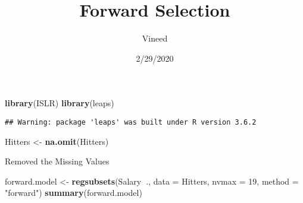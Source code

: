 \documentclass[
]{article}
\title{Forward Selection}
\author{Vineed}
\date{2/29/2020}
\newenvironment{Shaded}{\begin{snugshade}}{\end{snugshade}}
\newcommand{\DataTypeTok}[1]{\textcolor[rgb]{0.13,0.29,0.53}{#1}}
\newcommand{\DecValTok}[1]{\textcolor[rgb]{0.00,0.00,0.81}{#1}}
\newcommand{\KeywordTok}[1]{\textcolor[rgb]{0.13,0.29,0.53}{\textbf{#1}}}
\newcommand{\NormalTok}[1]{#1}
\newcommand{\OperatorTok}[1]{\textcolor[rgb]{0.81,0.36,0.00}{\textbf{#1}}}
\newcommand{\StringTok}[1]{\textcolor[rgb]{0.31,0.60,0.02}{#1}}
\begin{document}
\maketitle

\begin{Shaded}
\begin{Highlighting}[]
\KeywordTok{library}\NormalTok{(ISLR)}
\KeywordTok{library}\NormalTok{(leaps)}
\end{Highlighting}
\end{Shaded}

\begin{verbatim}
## Warning: package 'leaps' was built under R version 3.6.2
\end{verbatim}

\begin{Shaded}
\begin{Highlighting}[]
\NormalTok{Hitters <-}\StringTok{ }\KeywordTok{na.omit}\NormalTok{(Hitters)}
\end{Highlighting}
\end{Shaded}

Removed the Missing Values

\begin{Shaded}
\begin{Highlighting}[]
\NormalTok{forward.model <-}\StringTok{ }\KeywordTok{regsubsets}\NormalTok{(Salary}\OperatorTok{~}\NormalTok{., }\DataTypeTok{data =}\NormalTok{ Hitters, }
                            \DataTypeTok{nvmax =} \DecValTok{19}\NormalTok{, }\DataTypeTok{method =} \StringTok{"forward"}\NormalTok{)}
\KeywordTok{summary}\NormalTok{(forward.model)}
\end{Highlighting}
\end{Shaded}
\end{document}

